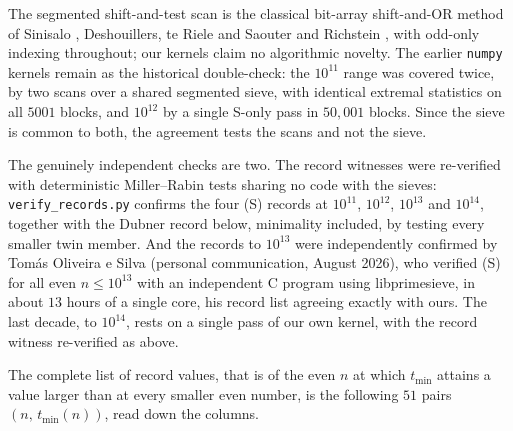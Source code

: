 \documentclass[10pt]{article}
\theoremstyle{definition}
\theoremstyle{remark}
\begin{document}
The segmented shift-and-test scan is the classical bit-array shift-and-OR
method of Sinisalo \cite{Sinisalo}, Deshouillers, te Riele and Saouter
\cite{DtRS} and Richstein \cite{Richstein}, with odd-only indexing throughout;
our kernels claim no algorithmic novelty. The earlier \texttt{numpy} kernels
remain as the historical double-check: the $10^{11}$ range was covered twice,
by two scans over a shared segmented sieve, with identical extremal statistics
on all $5001$ blocks, and $10^{12}$ by a single S-only pass in $50{,}001$
blocks. Since the sieve is common to both, the agreement tests the scans and
not the sieve.

The genuinely independent checks are two. The record witnesses were
re-verified with deterministic Miller--Rabin tests sharing no code with the
sieves: \texttt{verify\_records.py} confirms the four (S) records at
$10^{11}$, $10^{12}$, $10^{13}$ and $10^{14}$, together with the Dubner record
below, minimality included, by testing every smaller twin member. And the
records to $10^{13}$ were independently confirmed by Tom\'as Oliveira e Silva
(personal communication, August 2026), who verified (S) for all even
$n \le 10^{13}$ with an independent C program using libprimesieve, in about
$13$ hours of a single core, his record list agreeing exactly with ours. The
last decade, to $10^{14}$, rests on a single pass of our own kernel, with the
record witness re-verified as above.

The complete list of record values, that is of the even $n$ at which
$t_{\min}$ attains a value larger than at every smaller even number, is the
following $51$ pairs $(n,\, t_{\min}(n))$, read down the columns.
\end{document}
